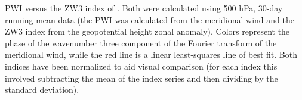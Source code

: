\label{fig:metric_vs_zw3}
PWI versus the ZW3 index of \citet{Raphael2004}. Both were calculated using 500 hPa, 30-day running mean data (the PWI was calculated from the meridional wind and the ZW3 index from the geopotential height zonal anomaly). Colors represent the phase of the wavenumber three component of the Fourier transform of the meridional wind, while the red line is a linear least-squares line of best fit. Both indices have been normalized to aid visual comparison (for each index this involved subtracting the mean of the index series and then dividing by the standard deviation).